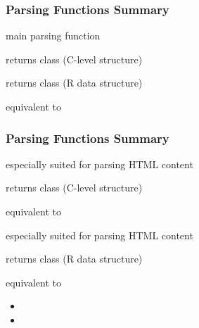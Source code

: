 \documentclass[12pt]{beamer}\usepackage[]{graphicx}\usepackage[]{color}
\begin{document}

\begin{frame}[fragile]
\frametitle{Parsing Functions Summary}

\bi
 \item main parsing function
 \item returns class  (C-level structure)
\ei
\eb

\bi
 \item returns class  (R data structure)
 \item equivalent to 
\ei
\eb

\end{frame}


\begin{frame}[fragile]
\frametitle{Parsing Functions Summary}

\bi
 \item especially suited for parsing HTML content
 \item returns class  (C-level structure)
 \item equivalent to 
\ei
\eb

\bi
 \item especially suited for parsing HTML content
 \item returns class  (R data structure)
 \item equivalent to
 \begin{itemize}
  \item {}
  \item {}
 \end{itemize}
\ei
\eb

\end{frame}

\end{document}
